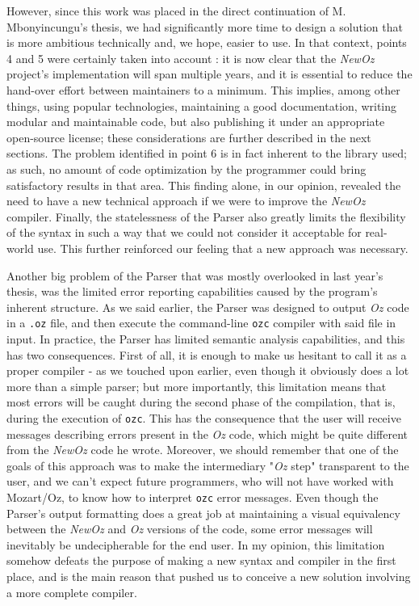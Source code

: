 However, since this work was placed in the direct continuation of M. Mbonyincungu's thesis, we had significantly more time to design a solution that is more ambitious technically and, we hope, easier to use.
In that context, points 4 and 5 were certainly taken into account : it is now clear that the \textit{NewOz} project's implementation will span multiple years, and it is essential to reduce the hand-over effort between maintainers to a minimum.
This implies, among other things, using popular technologies, maintaining a good documentation, writing modular and maintainable code, but also publishing it under an appropriate open-source license;
these considerations are further described in the next sections.
The problem identified in point 6 is in fact inherent to the library used;
as such, no amount of code optimization by the programmer could bring satisfactory results in that area.
This finding alone, in our opinion, revealed the need to have a new technical approach if we were to improve the \textit{NewOz} compiler.
Finally, the statelessness of the Parser also greatly limits the flexibility of the syntax in such a way that we could not consider it acceptable for real-world use.
This further reinforced our feeling that a new approach was necessary.\newline

Another big problem of the Parser that was mostly overlooked in last year's thesis, was the limited error reporting capabilities caused by the program's inherent structure.
As we said earlier, the Parser was designed to output \textit{Oz} code in a \texttt{.oz} file, and then execute the command-line \texttt{ozc} compiler with said file in input.
In practice, the Parser has limited semantic analysis capabilities, and this has two consequences.
First of all, it is enough to make us hesitant to call it as a proper compiler - as we touched upon earlier, even though it obviously does a lot more than a simple parser;
but more importantly, this limitation means that most errors will be caught during the second phase of the compilation, that is, during the execution of \texttt{ozc}.
This has the consequence that the user will receive messages describing errors present in the \textit{Oz} code, which might be quite different from the \textit{NewOz} code he wrote.
Moreover, we should remember that one of the goals of this approach was to make the intermediary "\textit{Oz} step" transparent to the user, and we can't expect future programmers, who will not have worked with Mozart/Oz, to know how to interpret \texttt{ozc} error messages.
Even though the Parser's output formatting does a great job at maintaining a visual equivalency between the \textit{NewOz} and \textit{Oz} versions of the code, some error messages will inevitably be undecipherable for the end user.
In my opinion, this limitation somehow defeats the purpose of making a new syntax and compiler in the first place, and is the main reason that pushed us to conceive a new solution involving a more complete compiler.

